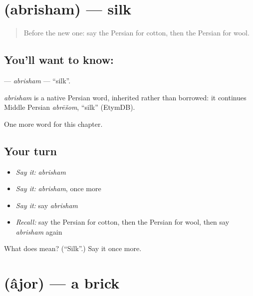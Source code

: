 \section[\texorpdfstring{\fa{ابریشم} (abrisham)}{ابریشم (abrisham)}]{ (abrisham) — silk}

\label{lesson:FA-C211-abrisham}



\begin{quote}
Before the new one: say the Persian for cotton, then the Persian for wool.
\end{quote}

\subsection*{You'll want to know: }
\textbf{} — \emph{abrisham} — \textquotedblleft{}silk\textquotedblright{}.

\begin{cousinweb}
\emph{abrisham} is a native Persian word, inherited rather than borrowed: it continues Middle Persian \emph{abrēšom}, \textquotedblleft{}silk\textquotedblright{} (EtymDB).
\end{cousinweb}

\begin{grammarlens}[title={What you've built}]
One more word for this chapter.
\end{grammarlens}

\subsection*{Your turn}
\begin{itemize}
\raggedright
  \item \emph{Say it:} \emph{abrisham}
  \item \emph{Say it:} \emph{abrisham}, once more
  \item \emph{Say it:} say \emph{abrisham}
  \item \emph{Recall:} say the Persian for cotton, then the Persian for wool, then say \emph{abrisham} again
\end{itemize}

\begin{tcolorbox}[breakable,colback=teal!4,colframe=teal!35!black,title={Before you move on}]
What does  mean? (\textquotedblleft{}Silk\textquotedblright{}.) Say it once more.
\end{tcolorbox}
\section[\texorpdfstring{\fa{آجر} (âjor)}{آجر (âjor)}]{ (âjor) — a brick}

